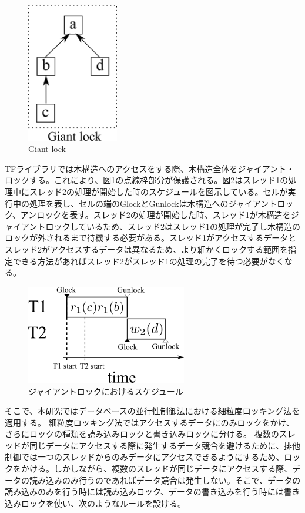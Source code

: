 \documentclass[a4paper]{jreport}	%
\begin{document}
\begin{figure}[h] 
\centering
\includegraphics[width=4cm]{gaint-lock}	
\caption{Giant lock}
\label{fig:giant-lock}
\end{figure}


TFライブラリでは木構造へのアクセスをする際、木構造全体をジャイアント・ロックする。これにより、図\ref{fig:giant-lock}の点線枠部分が保護される。図\ref{fig:g-lock-time}はスレッド1の処理中にスレッド2の処理が開始した時のスケジュールを図示している。セルが実行中の処理を表し、セルの端のGlockとGunlockは木構造へのジャイアントロック、アンロックを表す。スレッド2の処理が開始した時、スレッド1が木構造をジャイアントロックしているため、スレッド2はスレッド1の処理が完了し木構造のロックが外されるまで待機する必要がある。スレッド1がアクセスするデータとスレッド2がアクセスするデータは異なるため、より細かくロックする範囲を指定できる方法があればスレッド2がスレッド1の処理の完了を待つ必要がなくなる。


\begin{figure}[h] 
\centering
\includegraphics[width=7cm]{g-lock-time.png}	
\caption{ジャイアントロックにおけるスケジュール}
\label{fig:g-lock-time}
\end{figure}

そこで、本研究ではデータベースの並行性制御法における細粒度ロッキング法を適用する。
細粒度ロッキング法ではアクセスするデータにのみロックをかけ、さらにロックの種類を読み込みロックと書き込みロックに分ける。
複数のスレッドが同じデータにアクセスする際に発生するデータ競合を避けるために、排他制御では一つのスレッドからのみデータにアクセスできるようにするため、ロックをかける。しかしながら、複数のスレッドが同じデータにアクセスする際、データの読み込みのみ行うのであればデータ競合は発生しない。そこで、データの読み込みのみを行う時には読み込みロック、データの書き込みを行う時には書き込みロックを使い、次のようなルールを設ける。
\end{document}
